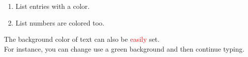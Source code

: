 \pagecolor{yellow!20!white}
\begin{minipage}{10cm}
\begin{enumerate}
\color{orange!61!black}
  \item List entries with a color.
  \item List numbers are colored too.
\end{enumerate}

The background color of text can also be
\textcolor{red}{easily} set.\\
For instance, you can change use a
\colorbox{green!20!white}{green background}
and then continue typing.
\end{minipage}

